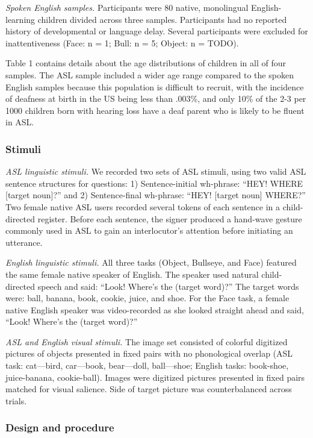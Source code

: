\documentclass[10pt, letterpaper]{article}
\begin{document}
\emph{Spoken English samples.} Participants were 80 native, monolingual
English-learning children divided across three samples. Participants had
no reported history of developmental or language delay. Several
participants were excluded for inattentiveness (Face: n = 1; Bull: n =
5; Object: n = TODO).

Table 1 contains details about the age distributions of children in all
of four samples. The ASL sample included a wider age range compared to
the spoken English samples because this population is difficult to
recruit, with the incidence of deafness at birth in the US being less
than .003\%, and only 10\% of the 2-3 per 1000 children born with
hearing loss have a deaf parent who is likely to be fluent in ASL.

\subsubsection{Stimuli}\label{stimuli}

\emph{ASL linguistic stimuli.} We recorded two sets of ASL stimuli,
using two valid ASL sentence structures for questions: 1)
Sentence-initial wh-phrase: ``HEY! WHERE {[}target noun{]}?'' and 2)
Sentence-final wh-phrase: ``HEY! {[}target noun{]} WHERE?'' Two female
native ASL users recorded several tokens of each sentence in a
child-directed register. Before each sentence, the signer produced a
hand-wave gesture commonly used in ASL to gain an interlocutor's
attention before initiating an utterance.

\emph{English linguistic stimuli.} All three tasks (Object, Bullseye,
and Face) featured the same female native speaker of English. The
speaker used natural child-directed speech and said: ``Look! Where's the
(target word)?'' The target words were: ball, banana, book, cookie,
juice, and shoe. For the Face task, a female native English speaker was
video-recorded as she looked straight ahead and said, ``Look! Where's
the (target word)?''

\emph{ASL and English visual stimuli.} The image set consisted of
colorful digitized pictures of objects presented in fixed pairs with no
phonological overlap (ASL task: cat---bird, car---book, bear---doll,
ball---shoe; English tasks: book-shoe, juice-banana, cookie-ball).
Images were digitized pictures presented in fixed pairs matched for
visual salience. Side of target picture was counterbalanced across
trials.

\subsubsection{Design and procedure}\label{design-and-procedure}
\end{document}
